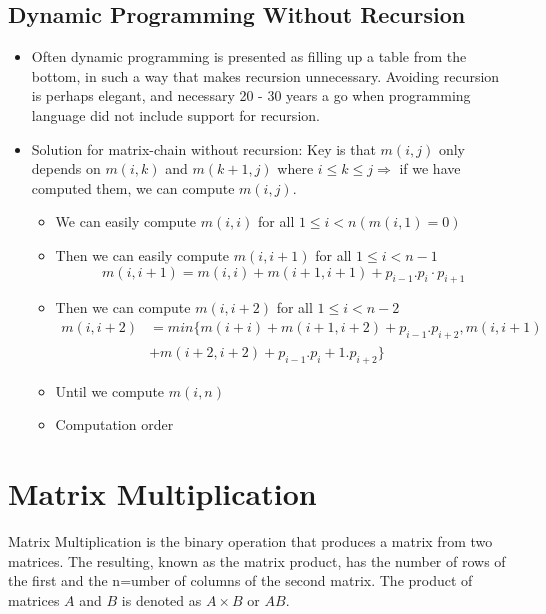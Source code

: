 \documentclass[12pt]{report}
\begin{document}
	\subsection{Dynamic Programming Without Recursion}
	\begin{itemize}
		\item Often dynamic programming is presented as filling up a table from the bottom, in such a way that makes recursion  unnecessary. Avoiding recursion is perhaps elegant, and necessary 20 - 30 years a go when programming language did not include support for recursion.
		\item Solution for matrix-chain without recursion: Key is that $m(i,j)$ only depends on $m(i,k)$ and $m(k+1,j)$ where $i \le k \le j \Rightarrow $ if we have computed them, we can compute $m(i,j)$.
		\begin{itemize}
			\item We can easily compute $m(i,i)$ for all $1\le i < n (m(i,1)=0)$
			\item Then we can easily compute $m(i, i+1)$ for all $1\le i < n-1$
			$$m(i,i+1) = m(i,i) + m(i+1, i+1) + p_{i-1}. p_i\cdot p_{i+1}$$
			\item Then we can compute $m(i,i+2)$ for all $1 \le i < n-2$
			\begin{align*}
				m(i, i+2) &= min\{m(i+i) + m(i+1, i+2) + p_{i-1}. p_{i+2}, m(i,i+1)\\
				&+ m(i+2, i+2) + p_{i-1}. p_i+1 . p_{i+2}\}
			\end{align*}
			\item Until we compute $m(i,n)$
			\item Computation order
		\end{itemize}
	\end{itemize}
	\section{Matrix Multiplication}
	Matrix Multiplication is the binary operation that produces a matrix from two matrices. The resulting, known as the matrix product, has the number of rows of the first and the n=umber of columns of the second matrix. The product of matrices $A$ and $B$ is denoted as $A\times B$ or $AB$.\\
\end{document}
